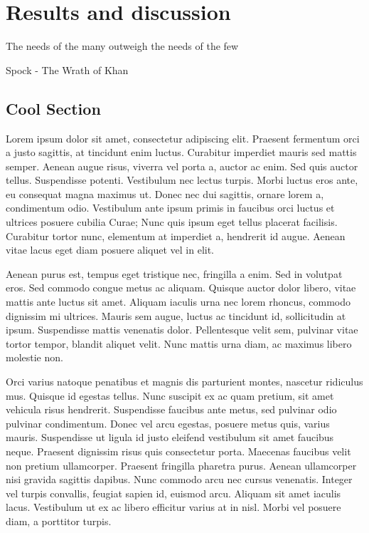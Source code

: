 \chapter{Results and discussion}

\begin{FraseCelebre}
  \begin{Frase}
    The needs of the many outweigh the needs of the few
  \end{Frase}
  \begin{Fuente}
    Spock - The Wrath of Khan
  \end{Fuente}
\end{FraseCelebre}

\section{Cool Section}

Lorem ipsum dolor sit amet, consectetur adipiscing elit. Praesent fermentum orci
a justo sagittis, at tincidunt enim luctus. Curabitur imperdiet mauris sed
mattis semper. Aenean augue risus, viverra vel porta a, auctor ac enim. Sed quis
auctor tellus. Suspendisse potenti. Vestibulum nec lectus turpis. Morbi luctus
eros ante, eu consequat magna maximus ut. Donec nec dui sagittis, ornare lorem
a, condimentum odio. Vestibulum ante ipsum primis in faucibus orci luctus et
ultrices posuere cubilia Curae; Nunc quis ipsum eget tellus placerat facilisis.
Curabitur tortor nunc, elementum at imperdiet a, hendrerit id augue. Aenean
vitae lacus eget diam posuere aliquet vel in elit.

Aenean purus est, tempus eget tristique nec, fringilla a enim. Sed in volutpat
eros. Sed commodo congue metus ac aliquam. Quisque auctor dolor libero, vitae
mattis ante luctus sit amet. Aliquam iaculis urna nec lorem rhoncus, commodo
dignissim mi ultrices. Mauris sem augue, luctus ac tincidunt id, sollicitudin at
ipsum. Suspendisse mattis venenatis dolor. Pellentesque velit sem, pulvinar
vitae tortor tempor, blandit aliquet velit. Nunc mattis urna diam, ac maximus
libero molestie non.

Orci varius natoque penatibus et magnis dis parturient montes, nascetur
ridiculus mus. Quisque id egestas tellus. Nunc suscipit ex ac quam pretium, sit
amet vehicula risus hendrerit. Suspendisse faucibus ante metus, sed pulvinar
odio pulvinar condimentum. Donec vel arcu egestas, posuere metus quis, varius
mauris. Suspendisse ut ligula id justo eleifend vestibulum sit amet faucibus
neque. Praesent dignissim risus quis consectetur porta. Maecenas faucibus velit
non pretium ullamcorper. Praesent fringilla pharetra purus. Aenean ullamcorper
nisi gravida sagittis dapibus. Nunc commodo arcu nec cursus venenatis. Integer
vel turpis convallis, feugiat sapien id, euismod arcu. Aliquam sit amet iaculis
lacus. Vestibulum ut ex ac libero efficitur varius at in nisl. Morbi vel posuere
diam, a porttitor turpis.

